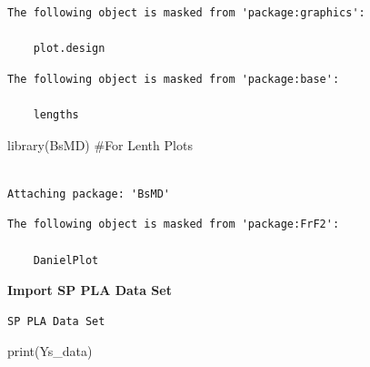 \documentclass[
  letterpaper,
  DIV=11,
  numbers=noendperiod]{scrartcl}
\newenvironment{Shaded}{\begin{snugshade}}{\end{snugshade}}
\newcommand{\CommentTok}[1]{\textcolor[rgb]{0.37,0.37,0.37}{#1}}
\newcommand{\DecValTok}[1]{\textcolor[rgb]{0.68,0.00,0.00}{#1}}
\newcommand{\FunctionTok}[1]{\textcolor[rgb]{0.28,0.35,0.67}{#1}}
\newcommand{\NormalTok}[1]{\textcolor[rgb]{0.00,0.23,0.31}{#1}}
\newcommand{\OtherTok}[1]{\textcolor[rgb]{0.00,0.23,0.31}{#1}}
\newcommand{\SpecialCharTok}[1]{\textcolor[rgb]{0.37,0.37,0.37}{#1}}
\newcommand{\StringTok}[1]{\textcolor[rgb]{0.13,0.47,0.30}{#1}}
\begin{document}
\begin{verbatim}
The following object is masked from 'package:graphics':

    plot.design
\end{verbatim}

\begin{verbatim}
The following object is masked from 'package:base':

    lengths
\end{verbatim}

\begin{Shaded}
\begin{Highlighting}[]
\FunctionTok{library}\NormalTok{(BsMD) }\CommentTok{\#For Lenth Plots}
\end{Highlighting}
\end{Shaded}

\begin{verbatim}

Attaching package: 'BsMD'
\end{verbatim}

\begin{verbatim}
The following object is masked from 'package:FrF2':

    DanielPlot
\end{verbatim}

\textbf{Import SP PLA Data Set }

\begin{Shaded}
\end{Shaded}

\begin{verbatim}
SP PLA Data Set
\end{verbatim}

\begin{Shaded}
\begin{Highlighting}[]
\FunctionTok{print}\NormalTok{(Ys\_data)}
\end{Highlighting}
\end{Shaded}
\end{document}
